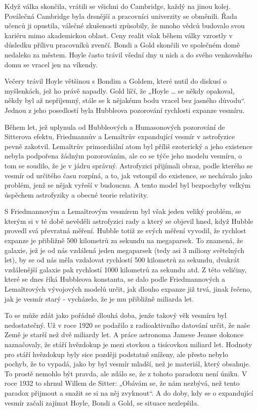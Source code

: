   Když válka skončila, vrátili se všichni do Cambridge, každý na jinou kolej. Poválečná Cambridge
  byla drsnější a pracovníci univerzity se obměnili. Řada učenců ji opustila, válečné zkušenosti
  způsobily, že mnoho vědců budovalo svou kariéru mimo akademickou oblast. Ceny realit však během
  války vzrostly v důsledku přílivu pracovníků zvenčí. Bondi a Gold skončili ve společném domě
  nedaleko za městem. Hoyle často trávil všední dny u nich a do svého venkovského domu se vracel jen
  na víkendy. 

  Večery trávil Hoyle většinou s Bondim a Goldem, které nutil do diskusí o myšlenkách, jež ho právě
  napadly. Gold líčí, že „Hoyle … se někdy opakoval, někdy byl až nepříjemný, stále se k nějakému
  bodu vracel bez jasného důvodu“. Jednou z jeho posedlostí byla Hubbleova pozorování rychlosti
  expanze vesmíru. 

  Během let, jež uplynula od Hubbleových a Humasonových pozorování de Sitterova efektu, Friedmannův
  a Lemaîtrův expandující vesmír v astrofyzice pevně zakotvil. Lemaîtrův primordiální atom byl
  příliš ezoterický a jeho existence nebyla podpořena žádným pozorováním, ale co se týče jeho modelu
  vesmíru, o tom se soudilo, že je v jádru správný. Astrofyzici přijímali obraz, podle kterého se
  vesmír od určitého času rozpíná, a to, jak vstoupil do existence, se nechávalo jako problém, jenž
  se nějak vyřeší v budoucnu. A tento model byl bezpochyby velkým úspěchem astrofyziky a obecné
  teorie relativity. 

  S Friedmannovým a Lemaîtrovým vesmírem byl však jeden veliký problém, se kterým si v té době
  nevěděli astrofyzici rady a který se objevil hned, když Hubble provedl svá převratná měření.
  Hubble totiž ze svých měření vyvodil, že rychlost expanze je přibližně 500 kilometrů za sekundu na
  megaparsek. To znamená, že galaxie, jež je od nás vzdálená jeden megaparsek (tedy asi 3 miliony
  světelných let), by se od nás měla vzdalovat rychlostí 500 kilometrů za sekundu, dvakrát
  vzdálenější galaxie pak rychlostí 1000 kilometrů za sekundu atd. Z této veličiny, které se dnes
  říká Hubbleova konstanta, se dalo podle Friedmannových a Lemaîtrových vývojových modelů určit, jak
  dlouho expanze již trvá, jinak řečeno, jak je vesmír starý - vycházelo, že je mu přibližně
  miliarda let. 

  To se může zdát jako pořádně dlouhá doba, jenže takový věk vesmíru byl nedostatečný. Už v roce
  1920 se podařilo z radioaktivního datování určit, že naše Země je starší než dvě miliardy let. A
  práce astronoma Jamese Jeanse dokonce naznačovaly, že stáří hvězdokup je mezi stovkou a tisícovkou
  miliard let. Hodnoty pro stáří hvězdokup byly sice později podstatně sníženy, ale přesto nebylo
  pochyb, že to vypadá, jako by byl vesmír mladší, než je materiál, který obsahuje. To prostě
  nemohlo být pravda, ale zdálo se, že z tohoto paradoxu není úniku. V roce 1932 to shrnul Willem de
  Sitter: „Obávám se, že nám nezbývá, než tento paradox přijmout a snažit se si na něj zvyknout“. A
  do doby, kdy se o expandující vesmír začali zajímat Hoyle, Bondi a Gold, se situace nezlepšila. 

